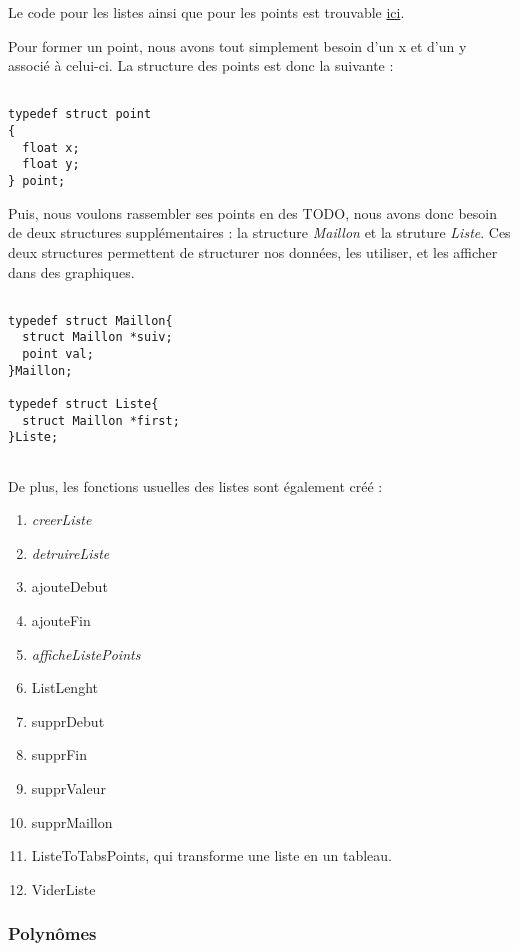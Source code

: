 \documentclass[letter]{article}
\begin{document}
Le code pour les listes ainsi que pour les points est trouvable \href{listePoint.c}{ici}.

Pour former un point, nous avons tout simplement besoin d'un x et d'un y associé à celui-ci.
La structure des points est donc la suivante :

\begin{verbatim}

typedef struct point
{
  float x;
  float y;
} point;

\end{verbatim}

Puis, nous voulons rassembler ses points en des TODO, nous avons donc besoin de deux structures supplémentaires : la structure \emph{Maillon} et la struture \emph{Liste}. Ces deux structures permettent de structurer nos données, les utiliser, et les afficher dans des graphiques.

\begin{verbatim}

typedef struct Maillon{
  struct Maillon *suiv;
  point val;
}Maillon;

typedef struct Liste{
  struct Maillon *first;
}Liste;


\end{verbatim}

De plus, les fonctions usuelles des listes sont également créé :
\begin{enumerate}
\item \emph{creerListe}
\item \emph{detruireListe}
\item ajouteDebut
\item ajouteFin
\item \emph{afficheListePoints}
\item ListLenght
\item supprDebut
\item supprFin
\item supprValeur
\item supprMaillon
\item ListeToTabsPoints, qui transforme une liste en un tableau.
\item ViderListe
\end{enumerate}



\subsubsection{Polynômes}
\label{sec:org084af76}
\end{document}
